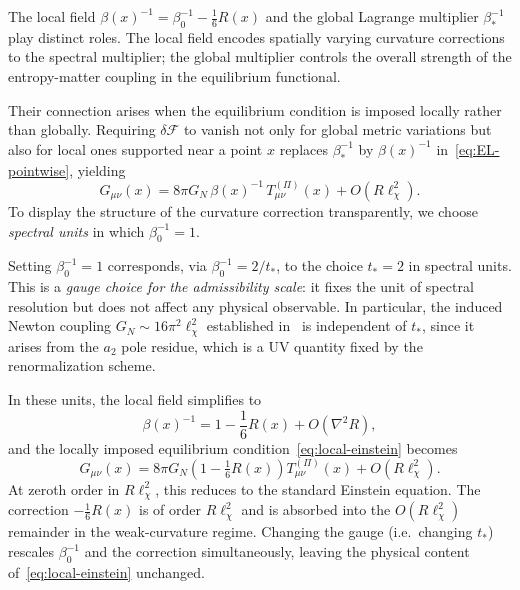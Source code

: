   The local field $\beta(x)^{-1} = \beta_0^{-1} - \frac{1}{6}R(x)$
  and the global Lagrange multiplier $\beta_*^{-1}$ play distinct roles.
  The local field encodes spatially varying curvature corrections to the spectral
  multiplier; the global multiplier controls the overall strength of the
  entropy-matter coupling in the equilibrium functional.

  Their connection arises when the equilibrium condition is imposed locally rather
  than globally.
  Requiring $\delta\mathcal{F}$ to vanish not only for global metric variations but
  also for local ones supported near a point $x$ replaces $\beta_*^{-1}$ by
  $\beta(x)^{-1}$ in~\eqref{eq:EL-pointwise}, yielding
  \begin{equation}
    G_{\mu\nu}(x)
    = 8\pi G_N\,\beta(x)^{-1}\,T^{(\Pi)}_{\mu\nu}(x) + O(R\ell_\chi^2).
    \label{eq:local-einstein}
  \end{equation}
  To display the structure of the curvature correction transparently, we
  choose \emph{spectral units} in which $\beta_0^{-1} = 1$.

  \begin{remark}[Gauge choice $\beta_0^{-1} = 1$ and the spectral scale $t_*$]
    \label{rem:gauge}
    Setting $\beta_0^{-1} = 1$ corresponds, via $\beta_0^{-1} = 2/t_*$, to the
    choice $t_* = 2$ in spectral units.
    This is a \emph{gauge choice for the admissibility scale}: it fixes the unit
    of spectral resolution but does not affect any physical observable.
    In particular, the induced Newton coupling $G_N \sim 16\pi^2 \ell_\chi^2$
    established in~\cite{Gravity20} is independent of $t_*$, since it arises from
    the $a_2$ pole residue, which is a UV quantity fixed by the renormalization scheme.

    In these units, the local field simplifies to
    \begin{equation}
      \beta(x)^{-1} = 1 - \frac{1}{6}R(x) + O(\nabla^2 R),
      \label{eq:beta-spectral-units}
    \end{equation}
    and the locally imposed equilibrium condition~\eqref{eq:local-einstein} becomes
    \begin{equation}
      G_{\mu\nu}(x)
      = 8\pi G_N\!\left(1 - \tfrac{1}{6}R(x)\right) T^{(\Pi)}_{\mu\nu}(x)
      + O(R\ell_\chi^2).
      \label{eq:local-einstein-units}
    \end{equation}
    At zeroth order in $R\ell_\chi^2$, this reduces to the standard Einstein equation.
    The correction $-\frac{1}{6}R(x)$ is of order $R\ell_\chi^2$ and is absorbed into
    the $O(R\ell_\chi^2)$ remainder in the weak-curvature regime.
    Changing the gauge (i.e.\ changing $t_*$) rescales $\beta_0^{-1}$ and the
    correction simultaneously, leaving the physical content of~\eqref{eq:local-einstein}
    unchanged.
  \end{remark}
